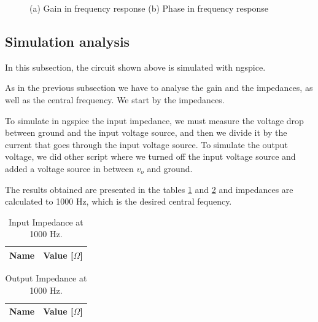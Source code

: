 \begin{figure}[h!]
           \centering
           \caption{(a) Gain in frequency response (b) Phase in frequency response}
           
\end{figure}


\subsection{Simulation analysis}
\label{sub:s1}

\par In this subsection, the circuit shown above is simulated with ngspice.

As in the previous subsection we have to analyse the gain and the impedances, as well as the central frequency.
We start by the impedances. \par To simulate in ngspice the input impedance, we must measure the voltage drop between ground and the input voltage source, and then 
we divide it by the current that goes through the input voltage source. To simulate the output voltage, we did other script where we turned off the input voltage source 
and added a voltage source in between $v_{o}$ and ground.  
\par The results obtained are presented in the tables \ref{tab:3} and \ref{tab:4} and impedances are calculated to 1000 Hz, which is the desired central fequency.

\begin{table}[h]
  \centering
  \begin{tabular}{|l|r|}
    \hline    
    {\bf Name} & {\bf Value [{$\Omega$}]} \\ \hline
    
  \end{tabular}
  \caption{Input Impedance at 1000 Hz.}
  \label{tab:3}
\end{table}

\begin{table}[h]
  \centering
  \begin{tabular}{|l|r|}
    \hline    
    {\bf Name} & {\bf Value [{$\Omega$}]} \\ \hline
    
  \end{tabular}
  \caption{Output Impedance at 1000 Hz.}
  \label{tab:4}
\end{table}

